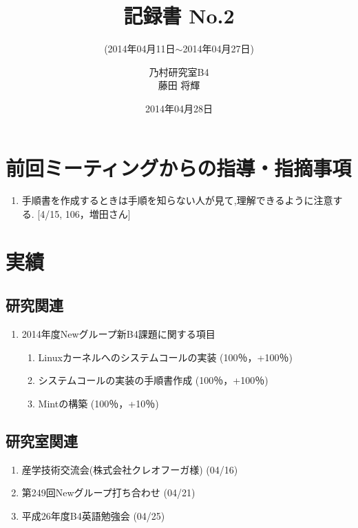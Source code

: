 \documentclass[fleqn, 14pt]{extarticle}
\subtitle{(2014年04月11日$\sim$2014年04月27日)}
\author{乃村研究室B4\\藤田 将輝}
\date{2014年04月28日}
\title{記録書 No.2}
\begin{document}
\maketitle
\section{前回ミーティングからの指導・指摘事項}
\label{sec-1}
\begin{enumerate}
\item 手順書を作成するときは手順を知らない人が見て,理解できるように注意する.
\newline
\hfill
[4/15, 106，増田さん]
\end{enumerate}
\section{実績}
\label{sec-2}
\subsection{研究関連}
\label{sec-2-1}
\begin{enumerate}
\item 2014年度Newグループ新B4課題に関する項目
\hfill
\label{enum-research1}
\begin{enumerate}

\item Linuxカーネルへのシステムコールの実装
\hfill
\label{enum-1-A}
(100％，+100％)
\item システムコールの実装の手順書作成
\hfill
\label{enum-1-B}
(100％，+100％)
\item Mintの構築
\hfill
\label{enum-1-C}
(100％，+10％)

\end{enumerate}
\end{enumerate}


\subsection{研究室関連}
\label{sec-2-2}

\begin{enumerate}
\item 産学技術交流会(株式会社クレオフーガ様)
\hfill
\label{enum-laboratory1}
(04/16)
\item 第249回Newグループ打ち合わせ
\hfill
\label{enum-laboratory2}
(04/21)
\item 平成26年度B4英語勉強会
\hfill
\label{enum-laboratory3}
(04/25)
\end{enumerate}
\end{document}
